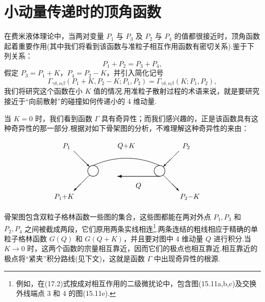\section{小动量传递时的顶角函数}

在费米液体理论中，当两对变量 $P_1$ 与 $P_3$ 及 $P_2$ 与 $P_4$ 的值都很接近时，顶角函数起着重要作用(其中我们将看到该函数与准粒子相互作用函数有密切关系).鉴于下列关系：
\begin{equation*}
  P_1+P_2=P_3+P_4,
\end{equation*}
假定 $P_3=P_1+K$，$P_4=P_2-K$，并引入简化记号
\begin{equation}
  \Gamma_{\gamma\delta,\alpha\beta}(P_1+K,P_2-K;P_1,P_2)=\Gamma_{\gamma\delta,\alpha\beta}(K;P_1,P_2),
\end{equation}
我们将研究这个函数在小 $K$ 值的情况.用准粒子散射过程的术语来说，就是要研究接近于“向前散射”的碰撞如何传递小的 4 维动量.

当 $K=0$ 时，我们看到函数 $\Gamma$ 具有奇异性；而我们感兴趣的，正是该函数具有这种奇异性的那一部分.根据对如下骨架图的分析，不难理解这种奇异性的来由：
\begin{equation}
  \setlength{\unitlength}{0.85pt}%
  \begin{picture}(310,110)(0,0)
    \put(58,88){\vector(1,-1){26}}%
    \put(232,88){\vector(-1,-1){26}}%
    \qbezier(90,46)(98.226,46.774)(99,55)%
    \qbezier(99,55)(98.226,63.226)(90,64)%
    \qbezier(90,64)(81.774,63.226)(81,55)%
    \qbezier(81,55)(81.774,46.774)(90,46)%
    \qbezier(200,46)(208.226,46.774)(209,55)%
    \qbezier(209,55)(208.226,63.226)(200,64)%
    \qbezier(200,64)(191.774,63.226)(191,55)%
    \qbezier(191,55)(191.774,46.774)(200,46)%
    \qbezier(90,64)(145,88)(200,64)%
    \put(145,96){\makebox(0,0){$Q{+}K$}}%
    \tarrL{200}{46}{70}%
    \put(165,30){\makebox(0,0){$Q$}}%
    \put(84,48){\vector(-1,-1){26}}%
    \put(206,48){\vector(1,-1){26}}%
    \put(46,96){\makebox(0,0){$P_1$}}%
    \put(244,96){\makebox(0,0){$P_2$}}%
    \put(42,12){\makebox(0,0){$P_1{+}K$}}%
    \put(250,12){\makebox(0,0){$P_2{-}K$}}%
  \end{picture}
\end{equation}
骨架图包含双粒子格林函数一些图的集合，这些图都能在两对外点 $P_1,P_3$ 和 $P_2,P_4$ 之间被截成两段，它们原用两条实线相连\footnote{例如，在(17.2)式按成对相互作用的二级微扰论中，包含图(15.11a,b,c)及交换外线端点 3 和 4 的图(15.11e).}.两条连结的粗线相应于精确的单粒子格林函数 $G(Q)$ 和 $G(Q+K)$，并且要对图中 4 维动量 $Q$ 进行积分.当 $K\to0$ 时，这两个函数的宗量相互靠近，因而它们的极点也相互靠近.相互靠近的极点将“紧夹”积分路线(见下文)，这就是函数 $\Gamma$ 中出现奇异性的根源.

